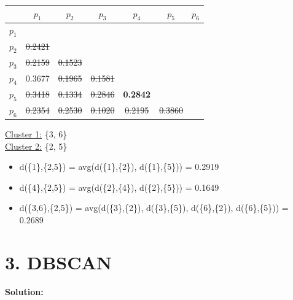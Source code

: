 \documentclass[11pt]{article}
\begin{document}
	\begin{center}
    	\begin{adjustbox}{max width=\textwidth}
		\begin{tabular}{ | c | c | c | c | c | c | c |}
	  	 	\hline

	  	 	& \textbf{$p_1$} & \textbf{$p_2$} & \textbf{$p_3$} & \textbf{$p_4$} & \textbf{$p_5$} & \textbf{$p_6$}\\
	  	 	\hline
	  	 	
	  	 	\textbf{$p_1$} &  &  &  &  &  &\\
	  	 	\hline
	  	 	
	  	 	\textbf{$p_2$} & \st{0.2421} &  &  &  &  &  \\
	  	 	\hline
	  	 	
	  	 	\textbf{$p_3$} & \st{0.2159} & \st{0.1523} &  &  &  & \\
	  	 	\hline
	  	 	
	  	 	\textbf{$p_4$} & 0.3677 & \st{0.1965} & \st{0.1581} &  &  & \\
	  	 	\hline
	  	 	
	  	 	\textbf{$p_5$} & \st{0.3418} & \st{0.1334} & \st{0.2846} & \textbf{0.2842} &  & \\
	  	 	\hline	
	  	 	
	  	 	\textbf{$p_6$} & \st{0.2354} & \st{0.2530} & \st{0.1020} & \st{0.2195} & \st{0.3860} & \\
	  	 	\hline			
    		\end{tabular}
    	\end{adjustbox}
	\end{center}
	
	\underline{Cluster 1:} \{3, 6\} \\
	\underline{Cluster 2:} \{2, 5\} \\
	
	
	\begin{itemize}
		\item d(\{1\},\{2,5\}) = avg(d(\{1\},\{2\}), d(\{1\},\{5\})) = 0.2919
		\item d(\{4\},\{2,5\}) = avg(d(\{2\},\{4\}), d(\{2\},\{5\})) = 0.1649
		\item d(\{3,6\},\{2,5\}) = avg(d(\{3\},\{2\}), d(\{3\},\{5\}), d(\{6\},\{2\}), d(\{6\},\{5\})) = 0.2689
	\end{itemize}
	\section*{3. DBSCAN}

	\textbf{Solution:}\\
	\newpage
\end{document}

